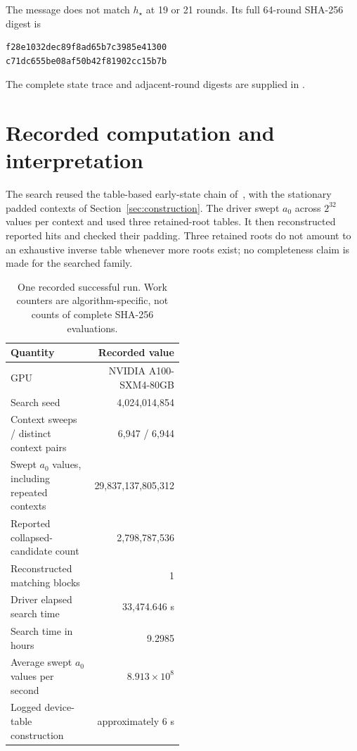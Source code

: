 \documentclass[11pt,a4paper]{article}
\begin{document}
\begin{samepage}
The message does not match $h_\star$ at 19 or 21 rounds. Its full 64-round SHA-256 digest is
\begin{Verbatim}[fontsize=\small]
f28e1032dec89f8ad65b7c3985e41300
c71dc655be08af50b42f81902cc15b7b
\end{Verbatim}
\end{samepage}
The complete state trace and adjacent-round digests are supplied in .

\section{Recorded computation and interpretation}
\label{sec:experiment}
The search reused the table-based early-state chain of~\cite{basra}, with the stationary padded contexts of Section~\ref{sec:construction}. The driver swept $a_0$ across $2^{32}$ values per context and used three retained-root tables. It then reconstructed reported hits and checked their padding. Three retained roots do not amount to an exhaustive inverse table whenever more roots exist; no completeness claim is made for the searched family.

\begin{table}[ht]
\centering\small
\begin{tabular}{@{}p{0.49\linewidth}r@{}}
\toprule
Quantity & Recorded value\\
\midrule
GPU & NVIDIA A100-SXM4-80GB\\
Search seed & 4,024,014,854\\
Context sweeps / distinct context pairs & 6,947 / 6,944\\
Swept $a_0$ values, including repeated contexts & 29,837,137,805,312\\
Reported collapsed-candidate count & 2,798,787,536\\
Reconstructed matching blocks & 1\\
Driver elapsed search time & 33,474.646 s\\
Search time in hours & 9.2985\\
Average swept $a_0$ values per second & $8.913\times10^8$\\
Logged device-table construction & approximately 6 s\\
\bottomrule
\end{tabular}
\caption{One recorded successful run. Work counters are algorithm-specific, not counts of complete SHA-256 evaluations.}
\end{table}
\end{document}
